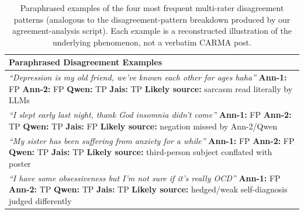 \documentclass[letterpaper]{article} %
\begin{document}
\begin{table}[t]
\centering
\footnotesize
\renewcommand{\arraystretch}{1.15}
\begin{tabular}{@{}p{}@{}}
\toprule
\textbf{Paraphrased Disagreement Examples} \\
\midrule
\textit{``Depression is my old friend, we've known each other for ages
haha''} \newline
\textbf{Ann-1:} FP \quad \textbf{Ann-2:} FP \quad \textbf{Qwen:} TP
\quad \textbf{Jais:} TP \quad \textbf{Likely source:} sarcasm read
literally by LLMs \\
\addlinespace[4pt] \hline \addlinespace[4pt]
\textit{``I slept early last night, thank God insomnia didn't
come''} \newline
\textbf{Ann-1:} FP \quad \textbf{Ann-2:} TP \quad \textbf{Qwen:} TP
\quad \textbf{Jais:} FP \quad \textbf{Likely source:} negation missed
by Ann-2/Qwen \\
\addlinespace[4pt] \hline \addlinespace[4pt]
\textit{``My sister has been suffering from anxiety for a
while''} \newline
\textbf{Ann-1:} FP \quad \textbf{Ann-2:} FP \quad \textbf{Qwen:} TP
\quad \textbf{Jais:} TP \quad \textbf{Likely source:} third-person
subject conflated with poster \\
\addlinespace[4pt] \hline \addlinespace[4pt]
\textit{``I have some obsessiveness but I'm not sure if it's really
OCD''} \newline
\textbf{Ann-1:} FP \quad \textbf{Ann-2:} TP \quad \textbf{Qwen:} TP
\quad \textbf{Jais:} TP \quad \textbf{Likely source:} hedged/weak
self-diagnosis judged differently \\
\bottomrule
\end{tabular}
\caption{Paraphrased examples of the four most frequent multi-rater
disagreement patterns (analogous to the disagreement-pattern breakdown
produced by our agreement-analysis script). Each example is a
reconstructed illustration of the underlying phenomenon, not a verbatim
CARMA post.}
\label{tab:disagreement_examples}
\end{table}
\end{document}
